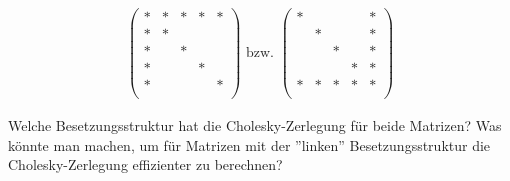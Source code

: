 \documentclass[titlepage]{article}
\begin{document}
\begin{align*}
	\begin{pmatrix}
		* & * & * & * & *\\
		* & * &   &   &  \\
		* &   & * &   &  \\
		* &   &   & * &  \\
		* &   &   &   & *\\
	\end{pmatrix}
	\text{ bzw. }
	\begin{pmatrix}
	* &   &   &   & *\\
	  & * &   &   & *\\
	  &   & * &   & *\\
	  &   &   & * & *\\
	* & * & * & * & *\\
\end{pmatrix}
\end{align*}

Welche Besetzungsstruktur hat die Cholesky-Zerlegung für beide Matrizen? Was könnte man machen, um für Matrizen mit der ''linken'' Besetzungsstruktur die Cholesky-Zerlegung effizienter zu berechnen?
\end{document}

